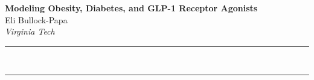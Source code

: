\documentclass[a4paper,12pt]{article}
\renewenvironment{abstract}
 {\par\noindent\textbf{\abstractname}\ \ignorespaces \\}
 {\par\noindent\medskip}
\begin{document}
\pagestyle{fancy}
\thispagestyle{empty}
\fancyhead[L]{}
\renewcommand*{\thefootnote}{\fnsymbol{footnote}}
\begin{center}
\Large{\textbf{Modeling Obesity, Diabetes, and GLP-1 Receptor Agonists}}
\vspace{0.4cm}
\normalsize
\\ Eli Bullock-Papa \\
\vspace{0.1cm}
\textit{Virginia Tech}
\medskip
\normalsize
\end{center}
{\color{gray}\hrule}
\vspace{0.4cm}
\begin{abstract}

\end{abstract}
{\color{gray}\hrule}
\medskip


\vspace{0.4cm}

\vspace{0.4cm}

\vspace{0.8cm}

\vspace{0.4cm}


\end{document}
